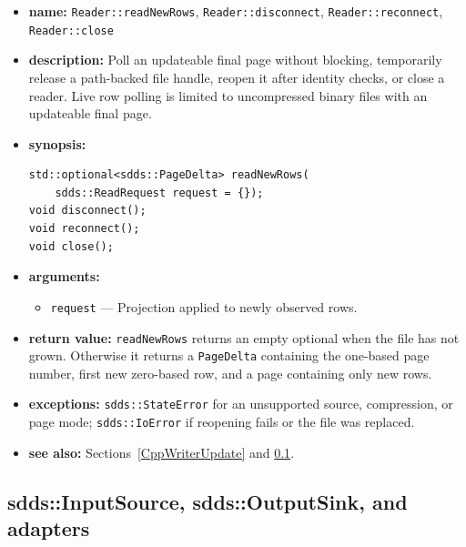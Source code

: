 \documentclass[11pt]{article}
\begin{document}
\begin{itemize}
\item {\bf name:}\newline
{\tt Reader::readNewRows}, {\tt Reader::disconnect},
{\tt Reader::reconnect}, {\tt Reader::close}
\item {\bf description:}\newline
Poll an updateable final page without blocking, temporarily release a
path-backed file handle, reopen it after identity checks, or close a reader.
Live row polling is limited to uncompressed binary files with an updateable
final page.
\item {\bf synopsis:}
\begin{verbatim}
std::optional<sdds::PageDelta> readNewRows(
    sdds::ReadRequest request = {});
void disconnect();
void reconnect();
void close();
\end{verbatim}
\item {\bf arguments:}
\begin{itemize}
\item {\tt request} --- Projection applied to newly observed rows.
\end{itemize}
\item {\bf return value:}\newline
{\tt readNewRows} returns an empty optional when the file has not grown.
Otherwise it returns a {\tt PageDelta} containing the one-based page number,
first new zero-based row, and a page containing only new rows.
\item {\bf exceptions:}\newline
{\tt sdds::StateError} for an unsupported source, compression, or page mode;
{\tt sdds::IoError} if reopening fails or the file was replaced.
\item {\bf see also:}\newline
Sections~\ref{CppWriterUpdate} and \ref{CppSources}.
\end{itemize}

\subsection{sdds::InputSource, sdds::OutputSink, and adapters}
\label{CppSources}
\end{document}
